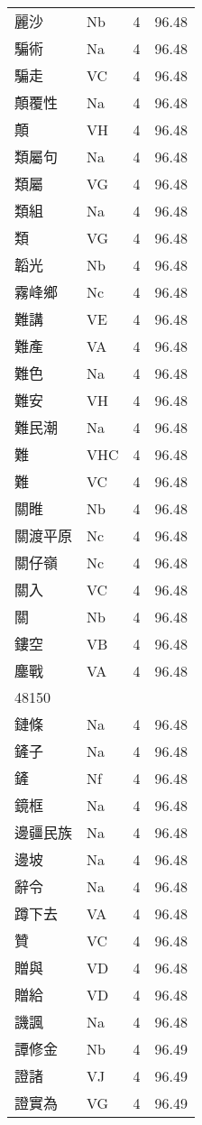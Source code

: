 \documentclass[twocolumn]{book}
\begin{document}
\begin{supertabular}{llrr}
麗沙 & Nb & 4 &  96.48\\
騙術 & Na & 4 &  96.48\\
騙走 & VC & 4 &  96.48\\
顛覆性 & Na & 4 &  96.48\\
顛 & VH & 4 &  96.48\\
類屬句 & Na & 4 &  96.48\\
類屬 & VG & 4 &  96.48\\
類組 & Na & 4 &  96.48\\
類 & VG & 4 &  96.48\\
韜光 & Nb & 4 &  96.48\\
霧峰鄉 & Nc & 4 &  96.48\\
難講 & VE & 4 &  96.48\\
難產 & VA & 4 &  96.48\\
難色 & Na & 4 &  96.48\\
難安 & VH & 4 &  96.48\\
難民潮 & Na & 4 &  96.48\\
難 & VHC & 4 &  96.48\\
難 & VC & 4 &  96.48\\
關睢 & Nb & 4 &  96.48\\
關渡平原 & Nc & 4 &  96.48\\
關仔嶺 & Nc & 4 &  96.48\\
關入 & VC & 4 &  96.48\\
關 & Nb & 4 &  96.48\\
鏤空 & VB & 4 &  96.48\\
鏖戰 & VA & 4 &  96.48\\
48150\\
鏈條 & Na & 4 &  96.48\\
鏟子 & Na & 4 &  96.48\\
鏟 & Nf & 4 &  96.48\\
鏡框 & Na & 4 &  96.48\\
邊疆民族 & Na & 4 &  96.48\\
邊坡 & Na & 4 &  96.48\\
辭令 & Na & 4 &  96.48\\
蹲下去 & VA & 4 &  96.48\\
贊 & VC & 4 &  96.48\\
贈與 & VD & 4 &  96.48\\
贈給 & VD & 4 &  96.48\\
譏諷 & Na & 4 &  96.48\\
譚修金 & Nb & 4 &  96.49\\
證諸 & VJ & 4 &  96.49\\
證實為 & VG & 4 &  96.49\\

\end{supertabular}
\end{document}
